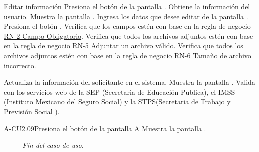 	\begin{UCtrayectoria}{Editar información }
        \UCpaso[\UCactor]Presiona el botón  de la pantalla .
        \UCpaso[\UCsist] Obtiene la información del usuario.
		\UCpaso[\UCsist] Muestra la pantalla . 
		\UCpaso[\UCactor] Ingresa los datos que desee editar de la pantalla .
		\UCpaso[\UCactor] Presiona el botón . 
		\UCpaso[\UCsist] Verifica que los campos estén con base en la regla de negocio \hyperlink{RN2}{RN-2 Campo Obligatorio}. 
	    \UCpaso[\UCsist] Verifica que todos los archivos adjuntos estén con base en la regla de negocio \hyperlink{RN5}{RN-5 Adjuntar un archivo válido}. 
	    \UCpaso[\UCsist] Verifica que todos los archivos adjuntos estén con base en la regla de negocio \hyperlink{RN6}{RN-6 Tamaño de archivo incorrecto}. 
		
        \UCpaso[\UCsist] Actualiza la información del solicitante en el sistema.
	    \UCpaso[\UCsist] Muestra la pantalla .
	    \UCpaso[\UCsist] Valida con los servicios web de la SEP (Secretaria de Educación Publica), el IMSS (Instituto Mexicano del Seguro Social)  y la STPS(Secretaria de Trabajo y Previsión Social ).
	
	\end{UCtrayectoria}
	

	

	
	

	\begin{UCtrayectoriaA}{A-CU2.09}{Presiona el botón  de la pantalla }{A}
		\UCpaso[\UCsist] Muestra la pantalla .
		\item[- -] - - {\em Fin del caso de uso.} 
	\end{UCtrayectoriaA}

